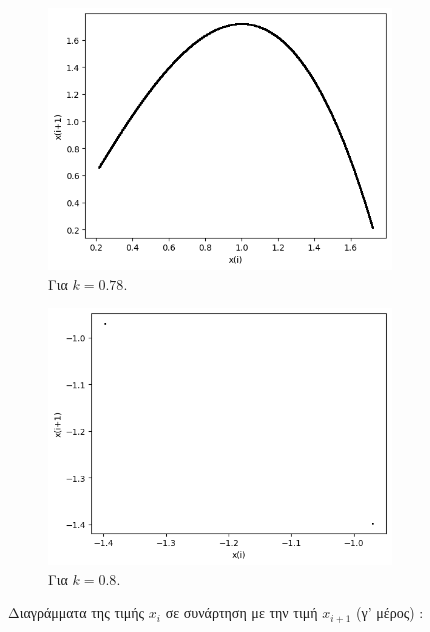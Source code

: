 \begin{figure}[h!]
\centering
	\begin{subfigure}[b]{0.4\textwidth}
		\centering
		\includegraphics[width=\textwidth]{LateX images/graphs q14/g25}
		\caption{Για $k=0.78$.}
		\label{f:k81}
	\end{subfigure}
	\hfill
	\begin{subfigure}[b]{0.4\textwidth}
		\centering
		\includegraphics[width=\textwidth]{LateX images/graphs q14/g26}
		\caption{Για $k=0.8$.}
		\label{f:k82}
	\end{subfigure}
	\hfill	
	\caption{Διαγράμματα της τιμής \(x_i\) σε συνάρτηση με την τιμή \(x_{i+1}\) (γ' μέρος) :}	
\end{figure}

